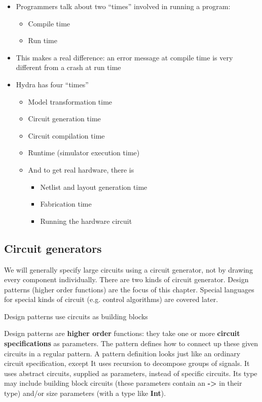 \documentclass[11pt]{article}
\begin{document}
\begin{itemize}
\item Programmers talk about two ``times'' involved in running a
program:

\begin{itemize}
\item Compile time
\item Run time
\end{itemize}

\item This makes a real difference: an error message at compile
time is very different from a crash at run time
\item Hydra has four ``times''

\begin{itemize}
\item Model transformation time
\item Circuit generation time
\item Circuit compilation time
\item Runtime (simulator execution time)
\item And to get real hardware, there is

\begin{itemize}
\item Netlist and layout generation time
\item Fabrication time
\item Running the hardware circuit
\end{itemize}
\end{itemize}
\end{itemize}

\subsection{Circuit generators}
\label{sec:org280004c}

We will generally specify large circuits using a circuit generator,
not by drawing every component individually.  There are two kinds of
circuit generator.  Design patterns (higher order functions) are the
focus of this chapter.  Special languages for special kinds of circuit
(e.g. control algorithms) are covered later.

Design patterns use circuits as building blocks

Design patterns are \textbf{higher order} functions: they take one or
more \textbf{circuit specifications} as parameters.  The pattern defines
how to connect up these given circuits in a regular pattern.  A
pattern definition looks just like an ordinary circuit specification,
except It uses recursion to decompose groups of signals.  It uses
abstract circuits, supplied as parameters, instead of specific
circuits.  Its type may include building block circuits (these
parameters contain an \textbf{->} in their type) and/or size
parameters (with a type like \textbf{Int}).
\end{document}
